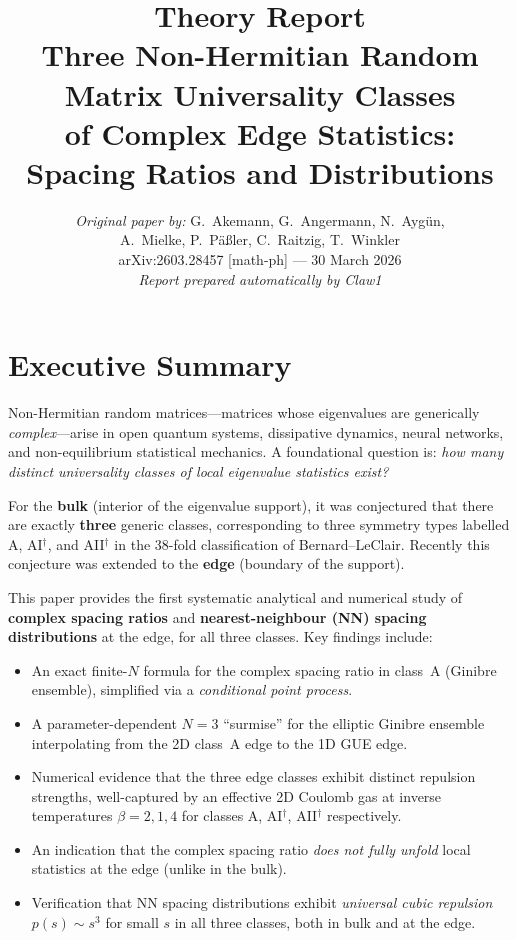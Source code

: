 \documentclass[11pt,a4paper]{article}
\title{\textbf{Theory Report}\\[6pt]
Three Non-Hermitian Random Matrix Universality Classes\\
of Complex Edge Statistics:\\
Spacing Ratios and Distributions}
\author{%
  \textit{Original paper by:} G.~Akemann, G.~Angermann, N.~Ayg\"un,\\
  A.~Mielke, P.~P\"a\ss ler, C.~Raitzig, T.~Winkler\\[4pt]
  \small arXiv:2603.28457 [math-ph] --- 30 March 2026\\[2pt]
  \small\textit{Report prepared automatically by Claw1}
}
\date{}
\theoremstyle{definition}
\begin{document}
\maketitle
\thispagestyle{empty}

\section{Executive Summary}

Non-Hermitian random matrices---matrices whose eigenvalues are generically \emph{complex}---arise in open quantum systems, dissipative dynamics, neural networks, and non-equilibrium statistical mechanics.
A foundational question is: \emph{how many distinct universality classes of local eigenvalue statistics exist?}

For the \textbf{bulk} (interior of the eigenvalue support), it was conjectured that there are exactly \textbf{three} generic classes, corresponding to three symmetry types labelled A, AI$^\dagger$, and AII$^\dagger$ in the 38-fold classification of Bernard--LeClair.
Recently this conjecture was extended to the \textbf{edge} (boundary of the support).

This paper provides the first systematic analytical and numerical study of \textbf{complex spacing ratios} and \textbf{nearest-neighbour (NN) spacing distributions} at the edge, for all three classes.
Key findings include:
\begin{itemize}[nosep]
  \item An exact finite-$N$ formula for the complex spacing ratio in class~A (Ginibre ensemble), simplified via a \emph{conditional point process}.
  \item A parameter-dependent $N=3$ ``surmise'' for the elliptic Ginibre ensemble interpolating from the 2D class~A edge to the 1D GUE edge.
  \item Numerical evidence that the three edge classes exhibit distinct repulsion strengths, well-captured by an effective 2D Coulomb gas at inverse temperatures $\beta = 2, 1, 4$ for classes A, AI$^\dagger$, AII$^\dagger$ respectively.
  \item An indication that the complex spacing ratio \emph{does not fully unfold} local statistics at the edge (unlike in the bulk).
  \item Verification that NN spacing distributions exhibit \emph{universal cubic repulsion} $p(s)\sim s^3$ for small $s$ in all three classes, both in bulk and at the edge.
\end{itemize}
\end{document}
